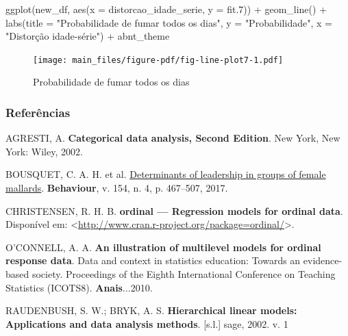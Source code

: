 \documentclass[
]{article}
\newenvironment{Shaded}{\begin{snugshade}}{\end{snugshade}}
\newcommand{\AttributeTok}[1]{\textcolor[rgb]{0.40,0.45,0.13}{#1}}
\newcommand{\FloatTok}[1]{\textcolor[rgb]{0.68,0.00,0.00}{#1}}
\newcommand{\FunctionTok}[1]{\textcolor[rgb]{0.28,0.35,0.67}{#1}}
\newcommand{\NormalTok}[1]{\textcolor[rgb]{0.00,0.23,0.31}{#1}}
\newcommand{\SpecialCharTok}[1]{\textcolor[rgb]{0.37,0.37,0.37}{#1}}
\newcommand{\StringTok}[1]{\textcolor[rgb]{0.13,0.47,0.30}{#1}}
\newlength{\cslhangindent}
\newlength{\cslentryspacingunit} %
\newenvironment{CSLReferences}[2] %
 {%
  \setlength{\parindent}{0pt}
  \ifodd #1
  \let\oldpar\par
  \def\par{\hangindent=\cslhangindent\oldpar}
  \fi
  \setlength{\parskip}{#2\cslentryspacingunit}
 }%
 {}
\begin{document}
\begin{Shaded}
\begin{Highlighting}[]
\FunctionTok{ggplot}\NormalTok{(new\_df, }\FunctionTok{aes}\NormalTok{(}\AttributeTok{x =}\NormalTok{ distorcao\_idade\_serie, }\AttributeTok{y =}\NormalTok{ fit}\FloatTok{.7}\NormalTok{)) }\SpecialCharTok{+} \FunctionTok{geom\_line}\NormalTok{() }\SpecialCharTok{+} \FunctionTok{labs}\NormalTok{(}\AttributeTok{title =} \StringTok{"Probabilidade de fumar todos os dias"}\NormalTok{, }\AttributeTok{y =} \StringTok{"Probabilidade"}\NormalTok{, }\AttributeTok{x =} \StringTok{"Distorção idade{-}série"}\NormalTok{) }\SpecialCharTok{+}\NormalTok{ abnt\_theme}
\end{Highlighting}
\end{Shaded}

\begin{figure}[H]

{\centering \texttt{[image: main\_files/figure-pdf/fig-line-plot7-1.pdf]}

}

\caption{\label{fig-line-plot7}Probabilidade de fumar todos os dias}

\end{figure}

\hypertarget{referuxeancias}{%
\subsubsection{Referências}\label{referuxeancias}}

\hypertarget{refs}{}
\begin{CSLReferences}{0}{1}
\leavevmode{}%
AGRESTI, A. \textbf{Categorical data analysis, Second Edition}. New
York, New York: Wiley, 2002.

\leavevmode{}%
BOUSQUET, C. A. H. et al.
\href{https://doi.org/10.1163/1568539X-00003431}{Determinants of
leadership in groups of female mallards}. \textbf{Behaviour}, v. 154, n.
4, p. 467--507, 2017.

\leavevmode{}%
CHRISTENSEN, R. H. B. \textbf{ordinal --- Regression models for ordinal
data}. Disponível em:
\textless{}\url{http://www.cran.r-project.org/package=ordinal/}\textgreater.

\leavevmode{}%
O'CONNELL, A. A. \textbf{An illustration of multilevel models for
ordinal response data}. Data and context in statistics education:
Towards an evidence-based society. Proceedings of the Eighth
International Conference on Teaching Statistics (ICOTS8).
\textbf{Anais}...2010.

\leavevmode{}%
RAUDENBUSH, S. W.; BRYK, A. S. \textbf{Hierarchical linear models:
Applications and data analysis methods}. {[}s.l.{]} sage, 2002. v. 1

\end{CSLReferences}
\end{document}
